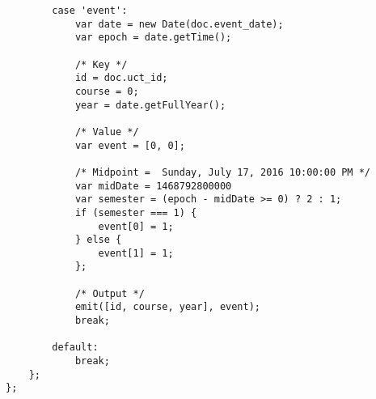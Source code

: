 \begin{verbatim}
        case 'event':
            var date = new Date(doc.event_date);
            var epoch = date.getTime();

            /* Key */
            id = doc.uct_id;
            course = 0;
            year = date.getFullYear();

            /* Value */
            var event = [0, 0];

            /* Midpoint =  Sunday, July 17, 2016 10:00:00 PM */
            var midDate = 1468792800000
            var semester = (epoch - midDate >= 0) ? 2 : 1;
            if (semester === 1) {
                event[0] = 1;
            } else {
                event[1] = 1;
            };

            /* Output */
            emit([id, course, year], event);
            break;

        default:
            break;
    };
};
\end{verbatim}

